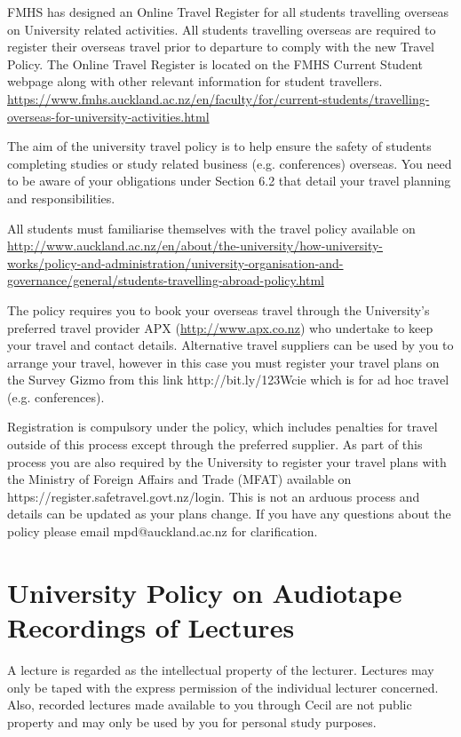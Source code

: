 \documentclass[11pt,fleqn]{book} %
\begin{document}
FMHS has designed an Online Travel Register for all students travelling overseas on University related activities. All students travelling overseas are required to register their overseas travel prior to departure to comply with the new Travel Policy. The Online Travel Register is located on the FMHS Current Student webpage along with other relevant information for student travellers. \url{https://www.fmhs.auckland.ac.nz/en/faculty/for/current-students/travelling-overseas-for-university-activities.html}

The aim of the university travel policy is to help ensure the safety of students completing studies or study related business (e.g. conferences) overseas. You need to be aware of your obligations under Section 6.2 that detail your travel planning and responsibilities. 

All students must familiarise themselves with the travel policy available on \url{http://www.auckland.ac.nz/en/about/the-university/how-university-works/policy-and-administration/university-organisation-and-governance/general/students-travelling-abroad-policy.html}

The policy requires you to book your overseas travel through the University's preferred travel provider APX (\url{http://www.apx.co.nz}) who undertake to keep your travel and contact details. Alternative travel suppliers can be used by you to arrange your travel, however in this case you must register your travel plans on the Survey Gizmo from this link http://bit.ly/123Wcie which is for ad hoc travel (e.g. conferences). 

Registration is compulsory under the policy, which includes penalties for travel outside of this process except through the preferred supplier.
As part of this process you are also required by the University to register your travel plans with the Ministry of Foreign Affairs and Trade (MFAT) available on https://register.safetravel.govt.nz/login. This is not an arduous process and details can be updated as your plans change. 
If you have any questions about the policy please email mpd@auckland.ac.nz for clarification. 



\section{University Policy on Audiotape Recordings of Lectures}

A lecture is regarded as the intellectual property of the lecturer.  Lectures may only be taped with the express permission of the individual lecturer concerned. Also, recorded lectures made available to you through Cecil are not public property and may only be used by you for personal study purposes.
\end{document}

